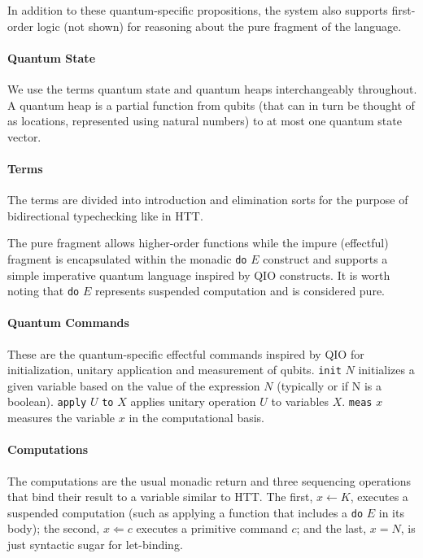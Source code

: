 \documentclass[acmsmall,nonacm,timestamp,review=false,anonymous=false]{acmart}
\newcommand{\kw}[1]{\,\mathrm{\texttt{#1}}\,}
\begin{document}
In addition to these quantum-specific propositions, the system also supports first-order logic (not shown) for reasoning about the pure fragment of the language.

\paragraph{Quantum State}

We use the terms quantum state and quantum heaps interchangeably throughout. A quantum heap is a partial function from qubits (that can in turn be thought of as locations, represented using natural numbers) to at most one quantum state vector.


\paragraph{Terms}
The terms are divided into introduction and elimination sorts for the purpose of bidirectional typechecking like in HTT.

The pure fragment allows higher-order functions while the impure (effectful) fragment is encapsulated within the monadic \texttt{do} $E$ construct and supports a simple imperative quantum language inspired by QIO constructs. It is worth noting that \texttt{do} $E$ represents suspended computation and is considered pure.

\paragraph{Quantum Commands}
These are the quantum-specific effectful commands inspired by QIO for initialization, unitary application and measurement of qubits.
\texttt{init} $N$ initializes a given variable based on the value of the expression $N$ (typically  or  if N is a boolean).
\texttt{apply} $U$ \texttt{to} $X$ applies unitary operation $U$ to variables $X$.
\texttt{meas} $x$ measures the variable $x$ in the computational basis.

\paragraph{Computations} The computations are the usual monadic return and three sequencing operations that bind their result to a variable similar to HTT. The first, $x \leftarrow K$, executes a suspended computation (such as applying a function that includes a \texttt{do} $E$ in its body); the second, $x \Leftarrow c$ executes a primitive command $c$; and the last, $x = N$, is just syntactic sugar for let-binding.
\end{document}
